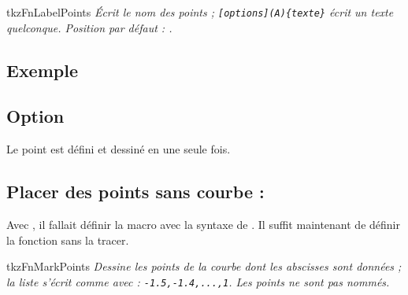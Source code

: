 \begin{NewMacroBox}{tkzFnLabelPoints}{}
\emph{Écrit le nom des points ; \texttt{[options](A)\{texte\}} écrit un texte quelconque. Position par défaut : .}
\end{NewMacroBox}

\subsection{Exemple}

\begin{center}
\begin{tkzexample}[vbox]
\end{tkzexample}
\end{center}

\subsection{Option }
Le point est défini et dessiné en une seule fois.

\begin{tkzexample}[latex=7cm,small]
\end{tkzexample}

\newpage
\subsection{Placer des points sans courbe : }

Avec , il fallait définir la macro  avec la syntaxe de . Il suffit maintenant de définir la fonction sans la tracer.

\begin{NewMacroBox}{tkzFnMarkPoints}{}
\emph{Dessine les points de la courbe dont les abscisses sont données ; la liste s'écrit comme avec  : \texttt{-1.5,-1.4,...,1}. Les points ne sont pas nommés.}
\end{NewMacroBox}


